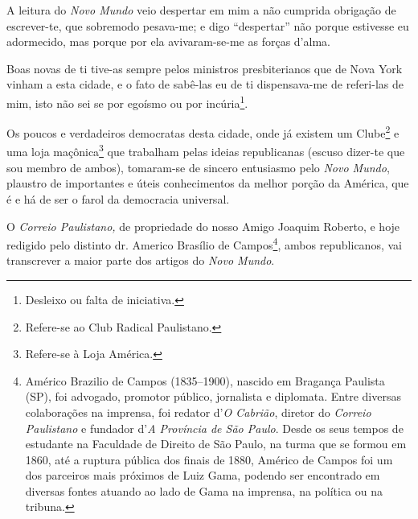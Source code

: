 {\asterisc{}


A leitura do \emph{Novo Mundo} veio despertar em mim a não cumprida
obrigação de escrever-te, que sobremodo pesava-me; e digo ``despertar''
não porque estivesse eu adormecido, mas porque por ela avivaram-se-me as
forças d'alma.

Boas novas de ti tive-as sempre pelos ministros presbiterianos que de
Nova York vinham a esta cidade, e o fato de sabê-las eu de ti
dispensava-me de referi-las de mim, isto não sei se por egoísmo ou por
incúria\footnote{ Desleixo ou falta de iniciativa.}.

Os poucos e verdadeiros democratas desta cidade, onde já existem um
Clube\footnote{ Refere-se ao Club Radical Paulistano.} e uma loja
maçônica\footnote{ Refere-se à Loja América.} que trabalham pelas
ideias republicanas (escuso dizer-te que sou membro de ambos),
tomaram-se de sincero entusiasmo pelo \emph{Novo Mundo}, plaustro de
importantes e úteis conhecimentos da melhor porção da América, que é e
há de ser o farol da democracia universal.

O \emph{Correio Paulistano,} de propriedade do nosso Amigo Joaquim
Roberto, e hoje redigido pelo distinto dr. Americo Brasílio de
Campos\footnote{ Américo Brazilio de Campos (1835--1900), nascido em
  Bragança Paulista (SP), foi advogado, promotor público, jornalista e
  diplomata. Entre diversas colaborações na imprensa, foi redator
  d'\emph{O Cabrião}, diretor do \emph{Correio Paulistano} e fundador
  d'\emph{A Província de São Paulo}. Desde os seus tempos de estudante
  na Faculdade de Direito de São Paulo, na turma que se formou em 1860,
  até a ruptura pública dos finais de 1880, Américo de Campos foi um dos
  parceiros mais próximos de Luiz Gama, podendo ser encontrado em
  diversas fontes atuando ao lado de Gama na imprensa, na política ou na
  tribuna.}, ambos republicanos, vai transcrever a maior parte dos
artigos do \emph{Novo Mundo}.

}
